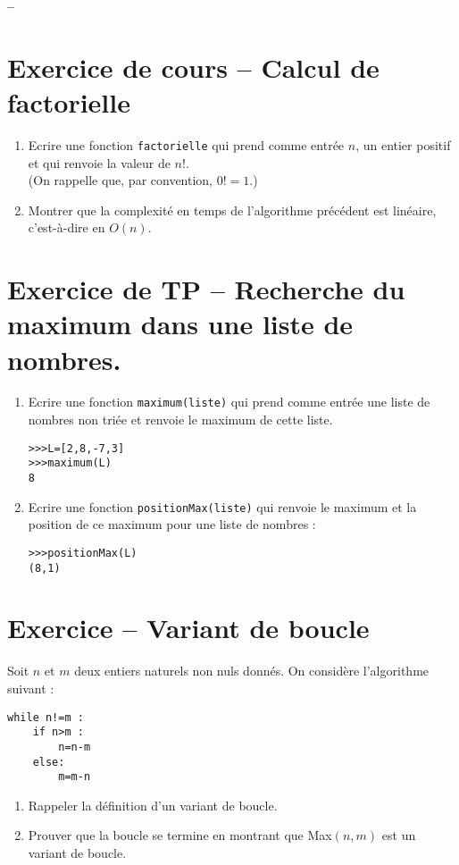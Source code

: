 





\begin{center}
{\Large\bf {\type} \no {\num} -- \descrip}
\end{center}



\section{Exercice de cours -- Calcul de factorielle}
\begin{enumerate}
\item Ecrire une fonction \verb?factorielle? qui prend comme entrée $n$, un entier positif et qui renvoie la valeur de $n!$.\\
(On rappelle que, par convention, $0!=1$.)
\item Montrer que la complexité en temps de l'algorithme précédent est linéaire, c'est-à-dire en $O(n)$.
\end{enumerate}


\section{Exercice de TP -- Recherche du maximum dans une liste de nombres.}
\begin{enumerate}
\item Ecrire une fonction \verb?maximum(liste)? qui prend comme entrée une liste de nombres non tri\' ee et renvoie le maximum de cette liste.
\begin{verbatim}
>>>L=[2,8,-7,3]
>>>maximum(L)
8
\end{verbatim}
\item Ecrire une fonction \verb?positionMax(liste)? qui renvoie le maximum et la position de ce maximum pour une liste de nombres :
\begin{verbatim}
>>>positionMax(L)
(8,1)
\end{verbatim}
\end{enumerate}

\section{Exercice -- Variant de boucle}
Soit $n$ et $m$ deux entiers naturels non nuls donnés. On considère l'algorithme suivant : 
\begin{verbatim}
while n!=m :
	if n>m :
		n=n-m
	else:
		m=m-n	
\end{verbatim}
\begin{enumerate}
\item Rappeler la définition d'un variant de boucle.
\item Prouver que la boucle se termine en montrant que Max$(n,m)$ est un variant de boucle.
\end{enumerate}


